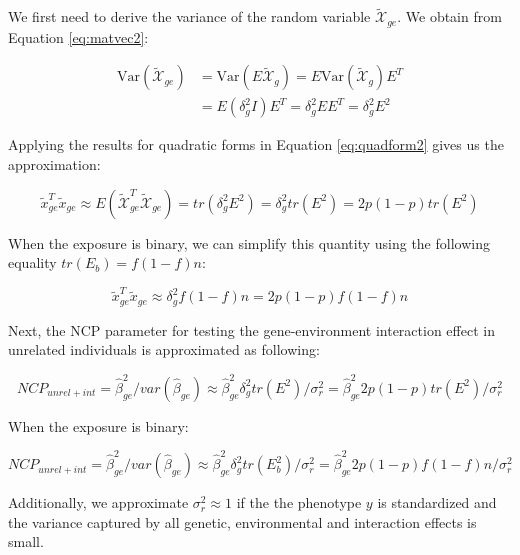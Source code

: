 \documentclass[]{book}
\theoremstyle{definition}
\theoremstyle{definition}
\theoremstyle{definition}
\theoremstyle{remark}
\begin{document}
We first need to derive the variance of the random variable
\(\mathcal{\tilde{X}}_{ge}\). We obtain from Equation \eqref{eq:matvec2}:

\begin{equation} 
\begin{split}
\mathrm{Var}(\mathcal{\tilde{X}}_{ge}) & = \mathrm{Var}(E \mathcal{\tilde{X}}_g) = E \mathrm{Var}(\mathcal{\tilde{X}}_g) E^T \\
 & = E (\delta_g^2 I) E^T = \delta_g^2 E E^T = \delta_g^2 E^2 
\end{split}
\label{eq:xgevar}
\end{equation}

Applying the results for quadratic forms in Equation \eqref{eq:quadform2}
gives us the approximation:

\begin{equation} 
\tilde{x}_{ge}^T \tilde{x}_{ge} \approx E(\mathcal{\tilde{X}}_{ge}^T \mathcal{\tilde{X}}_{ge}) = tr(\delta_g^2 E^2) = \delta_g^2 tr(E^2) = 2 p (1 - p) tr(E^2)
\label{eq:varbetahatlmg}
\end{equation}

When the exposure is binary, we can simplify this quantity using the
following equality \(tr(E_b) = f (1 - f) n\):

\begin{equation} 
\tilde{x}_{ge}^T \tilde{x}_{ge} \approx \delta_g^2 f (1 - f) n = 2 p (1 - p) f (1 - f) n
\label{eq:varbetahatlmgbin}
\end{equation}

Next, the NCP parameter for testing the gene-environment interaction
effect in unrelated individuals is approximated as following:

\begin{equation} 
NCP_{unrel + int} = \hat{\beta}_{ge}^2 / var(\hat{\beta}_{ge}) \approx \hat{\beta}_{ge}^2 \delta_g^2 tr(E^2) / \sigma_r^2 = \hat{\beta}_{ge}^2 2 p (1 - p) tr(E^2) / \sigma_r^2
\label{eq:ncplmge}
\end{equation}

When the exposure is binary:

\begin{equation} 
NCP_{unrel + int} = \hat{\beta}_{ge}^2 / var(\hat{\beta}_{ge}) \approx \hat{\beta}_{ge}^2 \delta_g^2 tr(E_b^2) / \sigma_r^2 = \hat{\beta}_{ge}^2 2 p (1 - p) f (1 - f) n / \sigma_r^2
\label{eq:ncplmgebin}
\end{equation}

Additionally, we approximate \(\sigma_r^2 \approx 1\) if the the
phenotype \(y\) is standardized and the variance captured by all
genetic, environmental and interaction effects is small.
\end{document}
